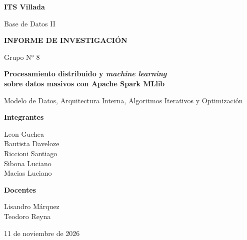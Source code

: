 \documentclass[conference,a4paper]{IEEEtran}
\begin{document}
\begin{titlepage}
\thispagestyle{empty}
\centering
\vspace*{2cm}
{\Large\bfseries ITS Villada\par}
\vspace{0.5cm}
{\large Base de Datos II\par}
\vfill
{\large\bfseries INFORME DE INVESTIGACIÓN\par}
\vspace{0.6cm}
{\large Grupo N° 8\par}
\vspace{1.5cm}
{\LARGE\bfseries Procesamiento distribuido y \textit{machine learning}\\
sobre datos masivos con Apache Spark MLlib\par}
\vspace{0.5cm}
{\large Modelo de Datos, Arquitectura Interna, Algoritmos Iterativos y Optimización\par}
\vfill
{\large\bfseries Integrantes\par}
\vspace{0.25cm}
Leon Guchea\\
Bautista Daveloze\\
Riccioni Santiago\\
Sibona Luciano\\
Macias Luciano
\vspace{0.8cm}

{\large\bfseries Docentes\par}
\vspace{0.25cm}
Lisandro Márquez\\
Teodoro Reyna
\vfill
{\large 11 de noviembre de 2026\par}
\vspace*{1cm}
\end{titlepage}
\setcounter{page}{1}
\pagestyle{plain}
\end{document}

